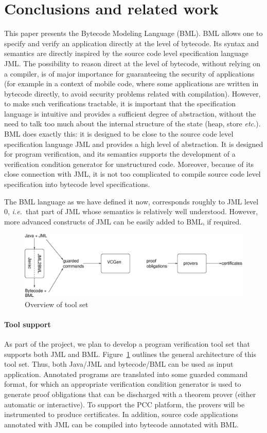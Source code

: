 \section{Conclusions and related work}\label{SecConcl}

This paper presents the Bytecode Modeling Language (BML). BML allows
one to specify and verify an application directly at the level of
bytecode. Its syntax and semantics are directly inspired by the source
code level specification language JML.  The possibility to reason
direct at the level of bytecode, without relying on a compiler, is of
major importance for guaranteeing the security of applications (for
example in a context of mobile code, where some applications are
written in bytecode directly, to avoid security problems related with
compilation). However, to make such verifications tractable, it is
important that the specification language is intuitive and provides a
sufficient degree of abstraction, without the need to talk too much
about the internal structure of the state (heap, store
\emph{etc.}). BML does exactly this: it is designed to be close to the
source code level specification language JML and provides a high level
of abstraction. It is designed for program verification, and its
semantics supports the development of a verification condition
generator for unstructured code. Moreover, because of its close
connection with JML, it is not too complicated to compile source code
level specification into bytecode level specifications.

The BML language as we have defined it now, corresponds roughly to JML
level 0, \emph{i.e.}\ that part of JML whose semantics is relatively
well understood. However, more advanced constructs of JML can be
easily added to BML, if required.

\begin{figure}[t]
\includegraphics[width=\textwidth]{toolset.eps} 
\caption{Overview of \mobius tool set}\label{FigToolSet}
\end{figure}
\paragraph{Tool support}
As part of the \mobius project, we plan to develop a program
verification tool set that supports both JML and
BML. Figure~\ref{FigToolSet} outlines the general architecture of this
tool set. Thus, both Java/JML and bytecode/BML can be used as input
application. Annotated programs are translated into some guarded
command format, for which an appropriate verification condition
generator is used to generate proof obligations that can be discharged
with a theorem prover (either automatic or interactive). To support
the PCC platform, the provers will be instrumented to produce
certificates. In addition, source code applications annotated with JML
can be compiled into bytecode annotated with BML.

